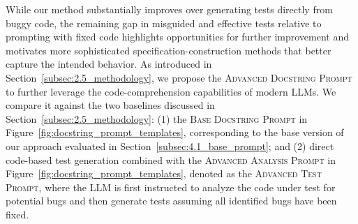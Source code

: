 \documentclass[acmsmall]{acmart}
\begin{document}
While our method substantially improves over generating tests directly from buggy code, the remaining gap in misguided and effective tests relative to prompting with fixed code highlights opportunities for further improvement and motivates more sophisticated specification-construction methods that better capture the intended behavior. As introduced in Section~\ref{subsec:2.5_methodology}, we propose the \textsc{Advanced Docstring Prompt} to further leverage the code-comprehension capabilities of modern LLMs. We compare it against the two baselines discussed in Section~\ref{subsec:2.5_methodology}: (1) the \textsc{Base Docstring Prompt} in Figure~\ref{fig:docstring_prompt_templates}, corresponding to the base version of our approach evaluated in Section~\ref{subsec:4.1_base_prompt}; and (2) direct code-based test generation combined with the \textsc{Advanced Analysis Prompt} in Figure~\ref{fig:docstring_prompt_templates}, denoted as the \textsc{Advanced Test Prompt}, where the LLM is first instructed to analyze the code under test for potential bugs and then generate tests assuming all identified bugs have been fixed.
\end{document}
